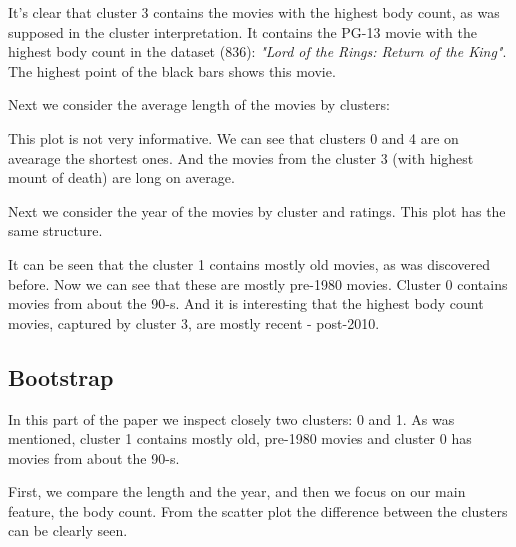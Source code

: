 \documentclass[a4paper,14pt]{article}
\begin{document}
It's clear that cluster 3 contains the movies with the highest body count, as was supposed in the cluster interpretation. It contains the PG-13 movie with the highest body count in the dataset (836): \textit{"Lord of the Rings: Return of the King"}. The highest point of the black bars shows this movie. 

Next we consider the average length of the movies by clusters: 
\begin{center}
\end{center}
 
This plot is not very informative. We can see that clusters 0 and 4 are on avearage the shortest ones. And the movies from the cluster 3 (with highest mount of death) are long on average. 

Next we consider the year of the movies by cluster and ratings. This plot has the same structure. 

\begin{center}
\end{center}
 
It can be seen that the cluster 1 contains mostly old movies, as was discovered before. Now we can see that these are mostly pre-1980 movies. Cluster 0 contains movies from about  the 90-s.
And it is interesting that the highest body count movies, captured by cluster 3, are mostly recent - post-2010.




\subsection{Bootstrap}

In this part of the paper we inspect closely two clusters: 0 and 1. As was mentioned, cluster 1 contains mostly old, pre-1980 movies and cluster 0 has movies from about the 90-s.

First, we compare the length and the year, and then we focus on our main feature, the body count. From the scatter plot the difference between the clusters can be clearly seen.
            
\begin{center}
\end{center}
 
\end{document}
